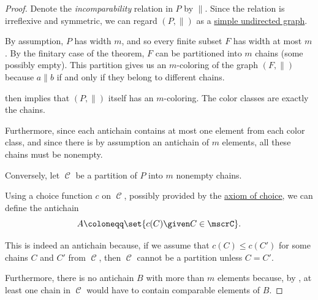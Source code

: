 \begin{proof}
   Denote the \emph{incomparability} relation in \( P \) by \( \parallel \). Since the relation is irreflexive and symmetric, we can regard \( (P, \parallel) \) as a \hyperref[def:undirected_graph]{simple undirected graph}.

  By assumption, \( P \) has width \( m \), and so every finite subset \( F \) has width at most \( m \). By the finitary case of the theorem, \( F \) can be partitioned into \( m \) chains (some possibly empty). This partition gives us an \( m \)-coloring of the graph \( (F, \parallel) \) because \( a \parallel b \) if and only if they belong to different chains.

   then implies that \( (P, \parallel) \) itself has an \( m \)-coloring. The color classes are exactly the chains.

  Furthermore, since each antichain contains at most one element from each color class, and since there is by assumption an antichain of \( m \) elements, all these chains must be nonempty.

  \NecessitySubProof Conversely, let \( \mscrC \) be a partition of \( P \) into \( m \) nonempty chains.

  Using a choice function \( c \) on \( \mscrC \), possibly provided by the \hyperref[def:zfc/choice]{axiom of choice}, we can define the antichain
  \begin{equation*}
    A \coloneqq \set{ c(C) \given C \in \mscrC }.
  \end{equation*}

  This is indeed an antichain because, if we assume that \( c(C) \leq c(C') \) for some chains \( C \) and \( C' \) from \( \mscrC \), then \( \mscrC \) cannot be a partition unless \( C = C' \).

  Furthermore, there is no antichain \( B \) with more than \( m \) elements because, by , at least one chain in \( \mscrC \) would have to contain comparable elements of \( B \).
\end{proof}

